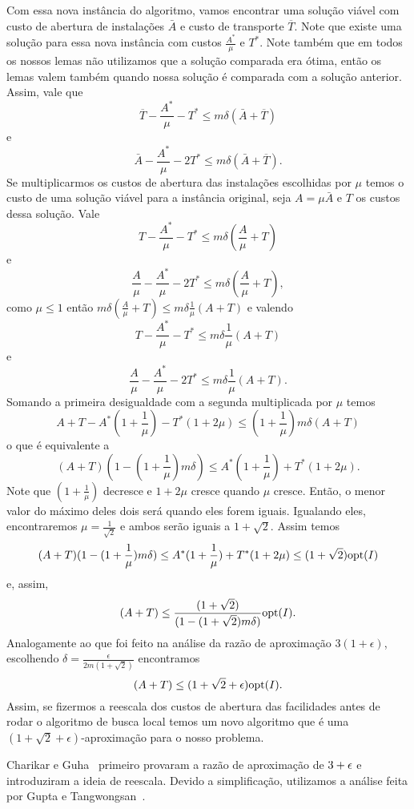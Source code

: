 Com essa nova instância do algoritmo, vamos encontrar uma solução viável com custo de abertura de instalações $\bar{A}$ e custo de transporte $\overline{T}$. Note que existe uma solução para essa nova instância com custos $\frac{A^*}{\mu}$ e $T^*$. Note também que em todos os nossos lemas não utilizamos  que a solução comparada era ótima, então os lemas valem também quando nossa solução é comparada com a solução anterior. Assim, vale que
\[ \overline{T} - \frac{A^*}{\mu} - T^* \leq m\delta(\bar{A} + \overline{T})\]
e
\[ \bar{A} - \frac{A^*}{\mu} - 2T^* \leq m\delta(\bar{A} + \overline{T}).\]
Se multiplicarmos os custos de abertura das instalações escolhidas por $\mu$ temos o custo de uma solução viável para a instância original, seja $A = \mu\bar{A}$ e $T$ os custos dessa solução. Vale
\[ T - \frac{A^*}{\mu} - T^* \leq m\delta(\frac{A}{\mu}+ T)\]
e
\[ \frac{A}{\mu} - \frac{A^*}{\mu} - 2T^* \leq m\delta(\frac{A}{\mu} + T),\]
como $\mu \leq 1$ então $m\delta(\frac{A}{\mu}+ T) \leq m\delta\frac{1}{\mu}( A + T)$ e valendo 
\[T - \frac{A^*}{\mu} - T^* \leq m\delta\frac{1}{\mu}( A + T) \] 
e 
\[ \frac{A}{\mu} - \frac{A^*}{\mu} - 2T^* \leq m\delta\frac{1}{\mu}( A + T) .\]
Somando a primeira desigualdade com a segunda multiplicada por $\mu$ temos
\[A + T - A^* (1 + \frac{1}{\mu}) - T^*(1 + 2\mu) \leq (1 + \frac{1}{\mu})m\delta(A+T)\]
o que é equivalente a 
\[(A+T)(1 - (1+\frac{1}{\mu})m\delta)\leq A^* (1 + \frac{1}{\mu}) + T^*(1 + 2\mu).\]
Note que $(1+\frac{1}{\mu})$ decresce e $1 + 2\mu$ cresce quando $\mu$ cresce. Então, o menor valor do máximo deles dois será quando eles forem iguais. Igualando eles, encontraremos $\mu = \frac{1}{\sqrt{2}}$ e ambos serão iguais a $1 + \sqrt{2}$. Assim temos
\[(A+T)(1 - (1+\frac{1}{\mu})m\delta)\leq A^* (1 + \frac{1}{\mu}) + T^*(1 + 2\mu) \leq (1+\sqrt{2})\mathrm{opt}(I)\]
e, assim, 
\[(A+T)\leq \frac{(1+\sqrt{2})}{(1 - (1+\sqrt{2 })m\delta)}\mathrm{opt}(I).\]
Analogamente ao que foi feito na análise da razão de aproximação $3(1 + \epsilon)$, escolhendo $\delta = \frac{\epsilon}{2m(1+\sqrt{2})}$ encontramos 
\[(A+T) \leq (1 + \sqrt{2} + \epsilon )\mathrm{opt}(I).\]
Assim, se fizermos a reescala dos custos de abertura das facilidades antes de rodar o algoritmo de busca local temos um novo algoritmo que é uma $(1 + \sqrt{2} + \epsilon )$-aproximação para o nosso problema.

Charikar e Guha~\cite{Charikar&Guha'05} primeiro provaram a razão de aproximação de $3 + \epsilon$ e introduziram a ideia de reescala. Devido a simplificação, utilizamos a análise feita por Gupta e Tangwongsan~\cite{DBLP:journals/corr/abs-0809-2554}.